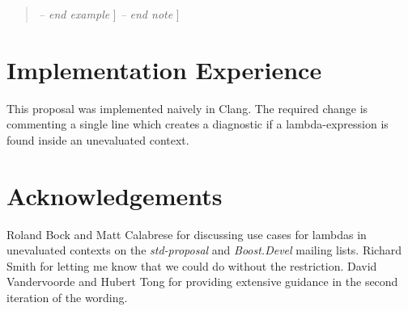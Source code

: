 \documentclass[11pt]{article}
\begin{document}
\begin{enumerate}
\begin{quote}
    \textit{-- end example} ]
    \textit{-- end note} ]
  \end{quote}

\end{enumerate}


\section{Implementation Experience}
This proposal was implemented naively in Clang. The required change is commenting
a single line which creates a diagnostic if a lambda-expression is found inside an
unevaluated context.


\section{Acknowledgements}
Roland Bock and Matt Calabrese for discussing use cases for lambdas in unevaluated
contexts on the \textit{std-proposal} and \textit{Boost.Devel} mailing lists.
Richard Smith for letting me know that we could do without the restriction.
David Vandervoorde and Hubert Tong for providing extensive guidance in the
second iteration of the wording.
\end{document}
